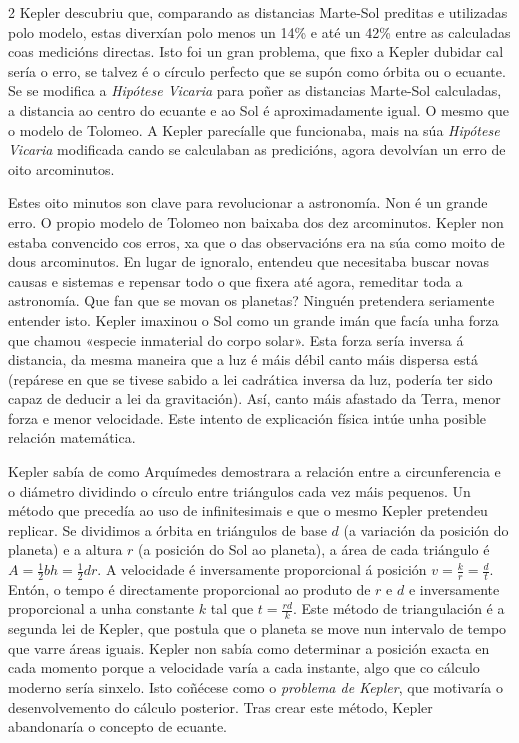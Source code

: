 \begin{multicols}{2}
Kepler descubriu que, comparando as distancias Marte-Sol preditas e utilizadas
polo modelo, estas diverxían polo menos un 14\% e até un 42\% entre as calculadas coas
medicións directas. Isto foi un gran problema, que fixo a Kepler dubidar cal
sería o erro, se talvez é o círculo perfecto que se supón como órbita ou o
ecuante. Se se modifica a \textit{Hipótese Vicaria} para poñer as distancias
Marte-Sol calculadas, a distancia ao centro do ecuante e ao Sol é
aproximadamente igual. O mesmo que o modelo de Tolomeo. A Kepler parecíalle
que funcionaba, mais na súa \textit{Hipótese Vicaria} modificada cando se
calculaban as predicións, agora devolvían un erro de oito arcominutos.

Estes oito minutos son clave para revolucionar a astronomía. Non é un grande
erro. O propio modelo de Tolomeo non baixaba dos dez arcominutos. Kepler non
estaba convencido cos erros, xa que o das observacións era na súa como moito de dous
arcominutos. En lugar de ignoralo, entendeu que necesitaba buscar novas causas e
sistemas e repensar todo o que fixera até agora, remeditar toda a astronomía.
Que fan que se movan os planetas? Ninguén pretendera seriamente entender isto.
Kepler imaxinou o Sol como un grande imán que facía unha forza que chamou
«especie inmaterial do corpo solar». Esta forza sería inversa á
distancia, da mesma maneira que a luz é máis débil canto máis dispersa está
(repárese en que se tivese sabido a lei cadrática inversa da luz,
podería ter sido capaz de deducir a lei da gravitación). Así, canto máis
afastado da Terra, menor forza e menor velocidade. Este intento de explicación
física intúe unha posible relación matemática.

Kepler sabía de como Arquímedes
demostrara a relación entre a circunferencia e o diámetro dividindo o círculo
entre triángulos cada vez máis pequenos. Un método que precedía ao uso de %
infinitesimais e que o mesmo Kepler pretendeu replicar. Se dividimos a órbita
en triángulos de base $d$ (a variación da posición do planeta) e a altura $r$
(a posición do Sol ao planeta), a área de cada triángulo é
$A=\frac{1}{2}bh=\frac{1}{2}dr$. A velocidade é inversamente proporcional á
posición $v=\frac{k}{r}=\frac{d}{t}$. Entón, o tempo é directamente
proporcional ao produto de $r$ e $d$ e inversamente proporcional a unha constante $k$ tal
que $t=\frac{rd}{k}$. Este método de triangulación é a segunda lei de Kepler,
que postula que o planeta se move nun intervalo de tempo que varre áreas
iguais. Kepler non sabía como determinar a posición exacta en cada momento
porque a velocidade varía a cada instante, algo que co cálculo moderno sería
sinxelo. Isto coñécese como o \textit{problema de Kepler}, que motivaría o
desenvolvemento do cálculo posterior. Tras crear este método, Kepler
abandonaría o concepto de ecuante.


\end{multicols}
